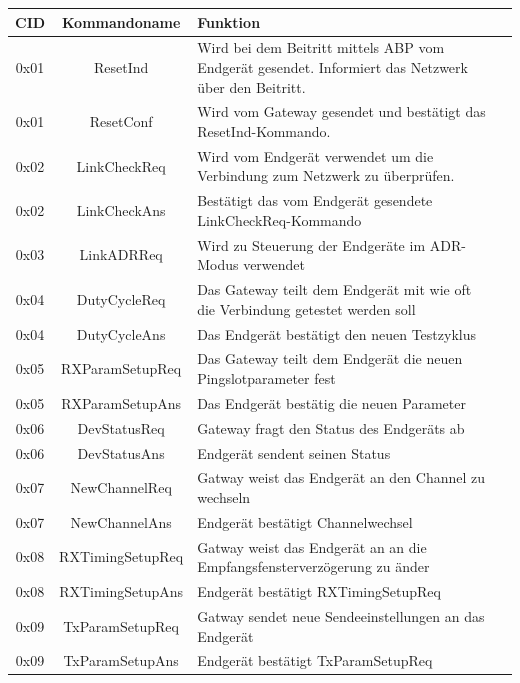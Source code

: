 \documentclass[a4paper, 12pt]{article}
\begin{document}
                    
                \begin{longtable}{c |c | p{9cm} c}
                    \centering
                    CID & Kommandoname & Funktion \\
                    \hline
                    0x01 & ResetInd & Wird bei dem Beitritt mittels ABP vom Endgerät gesendet. Informiert das Netzwerk über den Beitritt. \\
                    0x01 & ResetConf & Wird vom Gateway gesendet und bestätigt das ResetInd-Kommando. \\
                    0x02 & LinkCheckReq & Wird vom Endgerät verwendet um die Verbindung zum Netzwerk zu überprüfen. \\
                    0x02 & LinkCheckAns & Bestätigt das vom Endgerät gesendete LinkCheckReq-Kommando \\
                    0x03 & LinkADRReq & Wird zu Steuerung der Endgeräte im ADR-Modus verwendet \\
                    0x04 & DutyCycleReq & Das Gateway teilt dem Endgerät mit wie oft die Verbindung getestet werden soll \\
                    0x04 & DutyCycleAns & Das Endgerät bestätigt den neuen Testzyklus \\
                    0x05 & RXParamSetupReq & Das Gateway teilt dem Endgerät die neuen Pingslotparameter fest \\
                    0x05 & RXParamSetupAns & Das Endgerät bestätig die neuen Parameter \\
                    0x06 & DevStatusReq & Gateway fragt den Status des Endgeräts ab \\
                    0x06 & DevStatusAns & Endgerät sendent seinen Status \\
                    0x07 & NewChannelReq & Gatway weist das Endgerät an den Channel zu wechseln \\
                    0x07 & NewChannelAns & Endgerät bestätigt Channelwechsel \\
                    0x08 & RXTimingSetupReq & Gatway weist das Endgerät an an die Empfangsfensterverzögerung zu änder \\
                    0x08 & RXTimingSetupAns & Endgerät bestätigt RXTimingSetupReq \\
                    0x09 & TxParamSetupReq & Gatway sendet neue Sendeeinstellungen an das Endgerät \\
                    0x09 & TxParamSetupAns & Endgerät bestätigt TxParamSetupReq \\

\end{longtable}
\end{document}
